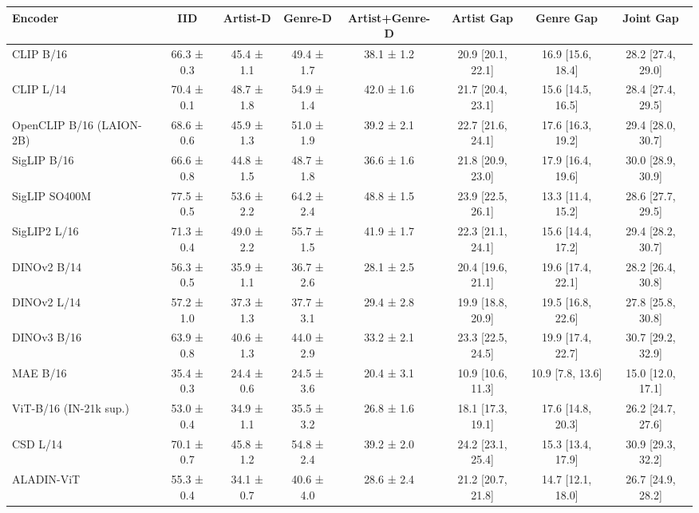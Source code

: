 \begin{tabular}{lccccccc}
\toprule
Encoder & IID & Artist-D & Genre-D & Artist+Genre-D & Artist Gap & Genre Gap & Joint Gap \\
\midrule
CLIP B/16 & 66.3 ± 0.3 & 45.4 ± 1.1 & 49.4 ± 1.7 & 38.1 ± 1.2 & 20.9 [20.1, 22.1] & 16.9 [15.6, 18.4] & 28.2 [27.4, 29.0] \\
CLIP L/14 & 70.4 ± 0.1 & 48.7 ± 1.8 & 54.9 ± 1.4 & 42.0 ± 1.6 & 21.7 [20.4, 23.1] & 15.6 [14.5, 16.5] & 28.4 [27.4, 29.5] \\
OpenCLIP B/16 (LAION-2B) & 68.6 ± 0.6 & 45.9 ± 1.3 & 51.0 ± 1.9 & 39.2 ± 2.1 & 22.7 [21.6, 24.1] & 17.6 [16.3, 19.2] & 29.4 [28.0, 30.7] \\
SigLIP B/16 & 66.6 ± 0.8 & 44.8 ± 1.5 & 48.7 ± 1.8 & 36.6 ± 1.6 & 21.8 [20.9, 23.0] & 17.9 [16.4, 19.6] & 30.0 [28.9, 30.9] \\
SigLIP SO400M & 77.5 ± 0.5 & 53.6 ± 2.2 & 64.2 ± 2.4 & 48.8 ± 1.5 & 23.9 [22.5, 26.1] & 13.3 [11.4, 15.2] & 28.6 [27.7, 29.5] \\
SigLIP2 L/16 & 71.3 ± 0.4 & 49.0 ± 2.2 & 55.7 ± 1.5 & 41.9 ± 1.7 & 22.3 [21.1, 24.1] & 15.6 [14.4, 17.2] & 29.4 [28.2, 30.7] \\
DINOv2 B/14 & 56.3 ± 0.5 & 35.9 ± 1.1 & 36.7 ± 2.6 & 28.1 ± 2.5 & 20.4 [19.6, 21.1] & 19.6 [17.4, 22.1] & 28.2 [26.4, 30.8] \\
DINOv2 L/14 & 57.2 ± 1.0 & 37.3 ± 1.3 & 37.7 ± 3.1 & 29.4 ± 2.8 & 19.9 [18.8, 20.9] & 19.5 [16.8, 22.6] & 27.8 [25.8, 30.8] \\
DINOv3 B/16 & 63.9 ± 0.8 & 40.6 ± 1.3 & 44.0 ± 2.9 & 33.2 ± 2.1 & 23.3 [22.5, 24.5] & 19.9 [17.4, 22.7] & 30.7 [29.2, 32.9] \\
MAE B/16 & 35.4 ± 0.3 & 24.4 ± 0.6 & 24.5 ± 3.6 & 20.4 ± 3.1 & 10.9 [10.6, 11.3] & 10.9 [7.8, 13.6] & 15.0 [12.0, 17.1] \\
ViT-B/16 (IN-21k sup.) & 53.0 ± 0.4 & 34.9 ± 1.1 & 35.5 ± 3.2 & 26.8 ± 1.6 & 18.1 [17.3, 19.1] & 17.6 [14.8, 20.3] & 26.2 [24.7, 27.6] \\
CSD L/14 & 70.1 ± 0.7 & 45.8 ± 1.2 & 54.8 ± 2.4 & 39.2 ± 2.0 & 24.2 [23.1, 25.4] & 15.3 [13.4, 17.9] & 30.9 [29.3, 32.2] \\
ALADIN-ViT & 55.3 ± 0.4 & 34.1 ± 0.7 & 40.6 ± 4.0 & 28.6 ± 2.4 & 21.2 [20.7, 21.8] & 14.7 [12.1, 18.0] & 26.7 [24.9, 28.2] \\
\bottomrule
\end{tabular}
